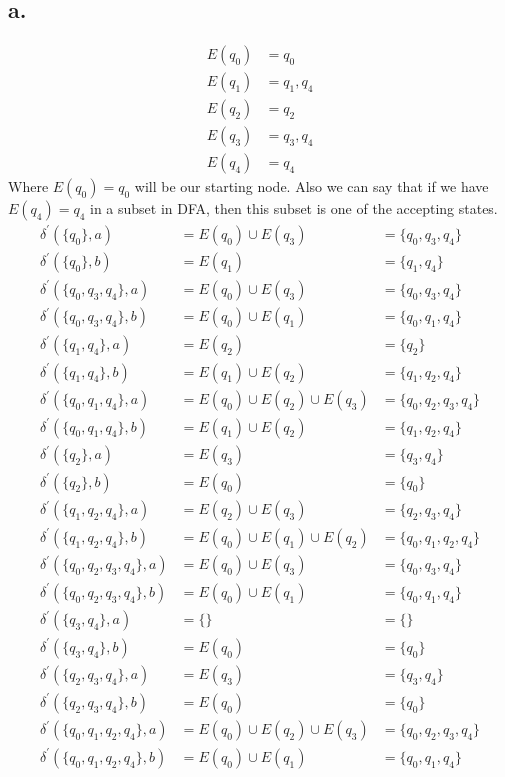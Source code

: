 \documentclass[12pt]{article}
\begin{document}
\subsection*{a.}

\begin{align*}
	E(q_0) & = {q_0} \\
	E(q_1) & = {q_1, q_4} \\
	E(q_2) & = {q_2} \\
	E(q_3) & = {q_3, q_4} \\
	E(q_4) & = {q_4} 
\end{align*}
Where $E(q_0)=q_0$ will be our starting node. Also we can say that if we have $E(q_4)=q_4$ in a subset in DFA, then this subset is one of the accepting states.\\

\begin{align*}
	\delta^{'} (\{q_0\}, a) & = E(q_0) \cup E(q_3) & = \{q_0, q_3, q_4\} \\
	\delta^{'} (\{q_0\}, b) & = E(q_1) & = \{q_1, q_4\} \\
	\delta^{'} (\{q_0, q_3, q_4\}, a) & = E(q_0) \cup E(q_3) & = \{q_0, q_3, q_4\} \\
	\delta^{'} (\{q_0, q_3, q_4\}, b) & = E(q_0) \cup E(q_1) & = \{q_0, q_1, q_4\} \\
	\delta^{'} (\{q_1, q_4\}, a) & = E(q_2) & = \{q_2\} \\
	\delta^{'} (\{q_1, q_4\}, b) & = E(q_1) \cup E(q_2) & = \{q_1, q_2, q_4\} \\
	\delta^{'} (\{q_0, q_1, q_4\}, a) & = E(q_0) \cup E(q_2) \cup E(q_3) & = \{q_0, q_2, q_3, q_4\} \\
	\delta^{'} (\{q_0, q_1, q_4\}, b) & = E(q_1) \cup E(q_2) & = \{q_1, q_2, q_4\} \\
	\delta^{'} (\{q_2\}, a) & = E(q_3) & = \{q_3, q_4\} \\
	\delta^{'} (\{q_2\}, b) & = E(q_0) & = \{q_0\} \\
	\delta^{'} (\{q_1, q_2, q_4\}, a) & = E(q_2) \cup E(q_3) & = \{q_2, q_3, q_4\} \\
	\delta^{'} (\{q_1, q_2, q_4\}, b) & = E(q_0) \cup E(q_1) \cup E(q_2) & = \{q_0, q_1, q_2, q_4\} \\
	\delta^{'} (\{q_0, q_2, q_3, q_4\}, a) & = E(q_0) \cup E(q_3) & = \{q_0, q_3, q_4\} \\
	\delta^{'} (\{q_0, q_2, q_3, q_4\}, b) & = E(q_0) \cup E(q_1) & = \{q_0, q_1, q_4\} \\
	\delta^{'} (\{q_3, q_4\}, a) & = \{\} & = \{\} \\
	\delta^{'} (\{q_3, q_4\}, b) & = E(q_0) & = \{q_0\} \\
	\delta^{'} (\{q_2, q_3, q_4\}, a) & = E(q_3) & = \{q_3, q_4\} \\
	\delta^{'} (\{q_2, q_3, q_4\}, b) & = E(q_0) & = \{q_0\} \\
	\delta^{'} (\{q_0, q_1, q_2, q_4\}, a) & = E(q_0) \cup E(q_2) \cup E(q_3) & = \{q_0, q_2, q_3, q_4\} \\
	\delta^{'} (\{q_0, q_1, q_2, q_4\}, b) & = E(q_0) \cup E(q_1) & = \{q_0, q_1, q_4\}
\end{align*}
\end{document}
